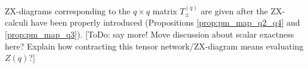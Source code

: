 ZX-diagrams corresponding to the $q \times q$ matrix $T_\pm^{(q)}$ are given after the ZX-calculi have been properly introduced (Propositions \ref{prop:pm_map_q2_q4} and \ref{prop:pm_map_q3}). [ToDo: say more! Move discussion about scalar exactness here? Explain how contracting this tensor network/ZX-diagram means evaluating $Z(q)$?]








